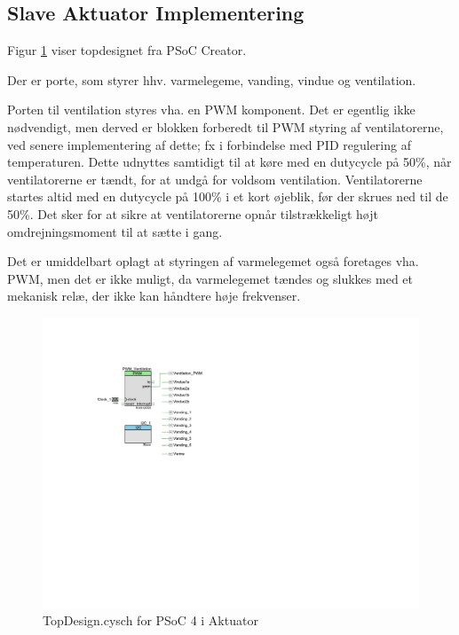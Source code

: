 \subsection{Slave Aktuator Implementering}
\label{ch:slave_aktuator_impl}

Figur \ref{fig:topdesign_aktuator} viser topdesignet fra PSoC Creator. 

Der er porte, som styrer hhv. varmelegeme, vanding, vindue og ventilation.

Porten til ventilation styres vha. en PWM komponent. 
Det er egentlig ikke nødvendigt, men derved er blokken forberedt til PWM styring af ventilatorerne, ved senere implementering af dette; fx i forbindelse med PID regulering af temperaturen. 
Dette udnyttes samtidigt til at køre med en dutycycle på 50\%, når ventilatorerne er tændt, for at undgå for voldsom ventilation. 
Ventilatorerne startes altid med en dutycycle på 100\% i et kort øjeblik, før der skrues ned til de 50\%.
Det sker for at sikre at ventilatorerne opnår tilstrækkeligt højt omdrejningsmoment til at sætte i gang.

Det er umiddelbart oplagt at styringen af varmelegemet også foretages vha. PWM, men det er ikke muligt, da varmelegemet tændes og slukkes med et mekanisk relæ, der ikke kan håndtere høje frekvenser. 

\begin{figure}[h]
\centering 
\includegraphics[width={\textwidth-8cm}, trim = 110 320 450 100, clip=true] {../fig/TopDesign_Aktuator.pdf}
\caption{TopDesign.cysch for PSoC 4 i Aktuator}
\label{fig:topdesign_aktuator}
\end{figure}

